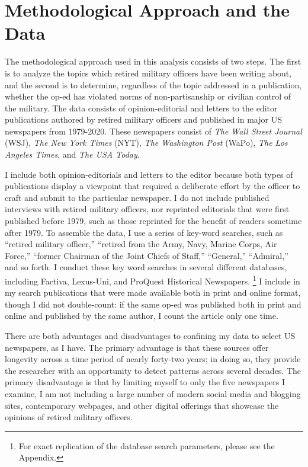 \documentclass[12pt,]{article}
\begin{document}
\hypertarget{methodological-approach-and-the-data}{%
\section{Methodological Approach and the Data}\label{methodological-approach-and-the-data}}

The methodological approach used in this analysis consists of two steps. The first is to analyze the topics which retired military officers have been writing about, and the second is to determine, regardless of the topic addressed in a publication, whether the op-ed has violated norms of non-partisanship or civilian control of the military. The data consists of opinion-editorial and letters to the editor publications authored by retired military officers and published in major US newspapers from 1979-2020. These newspapers consist of \emph{The Wall Street Journal} (WSJ), \emph{The New York Times} (NYT), \emph{The Washington Post} (WaPo), \emph{The Los Angeles Times}, and \emph{The USA Today}.

I include both opinion-editorials and letters to the editor because both types of publications display a viewpoint that required a deliberate effort by the officer to craft and submit to the particular newspaper. I do not include published interviews with retired military officers, nor reprinted editorials that were first published before 1979, such as those reprinted for the benefit of readers sometime after 1979. To assemble the data, I use a series of key-word searches, such as ``retired military officer,'' ``retired from the Army, Navy, Marine Corps, Air Force,'' ``former Chairman of the Joint Chiefs of Staff,'' ``General,'' ``Admiral,'' and so forth. I conduct these key word searches in several different databases, including Factiva, Lexus-Uni, and ProQuest Historical Newspapers. \footnote{For exact replication of the database search parameters, please see the Appendix.} I include in my search publications that were made available both in print and online format, though I did not double-count: if the same op-ed was published both in print and online and published by the same author, I count the article only one time.

There are both advantages and disadvantages to confining my data to select US newspapers, as I have. The primary advantage is that these sources offer longevity across a time period of nearly forty-two years; in doing so, they provide the researcher with an opportunity to detect patterns across several decades. The primary disadvantage is that by limiting myself to only the five newspapers I examine, I am not including a large number of modern social media and blogging sites, contemporary webpages, and other digital offerings that showcase the opinions of retired military officers.
\end{document}
